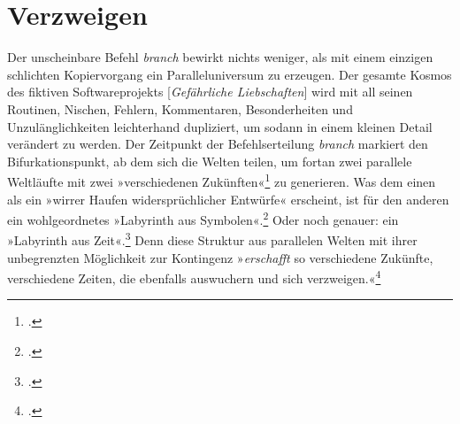 \documentclass[a4paper,11pt]{article}
\newcommand{\anf}[1]{»#1«}
\begin{document}
\section{Verzweigen}

Der unscheinbare Befehl \emph{branch} bewirkt nichts weniger, als mit einem einzigen schlichten Kopiervorgang ein Paralleluniversum zu erzeugen. Der gesamte Kosmos des fiktiven Softwareprojekts [\emph{Gefährliche Liebschaften}] wird mit all seinen Routinen, Nischen, Fehlern, Kommentaren, Besonderheiten und Unzulänglichkeiten leichterhand dupliziert, um sodann in einem kleinen Detail verändert zu werden. Der Zeitpunkt der Befehlserteilung \emph{branch} markiert den Bifurkationspunkt, ab dem sich die Welten teilen, um fortan zwei parallele Weltläufte mit zwei \anf{verschiedenen Zukünften}\footcite[169]{borges:1941} zu generieren. Was dem einen als ein \anf{wirrer Haufen widersprüchlicher Entwürfe} erscheint, ist für den anderen ein wohlgeordnetes \anf{Labyrinth aus Symbolen}.\footcite[168]{borges:1941} Oder noch genauer: ein \anf{Labyrinth aus Zeit}.\footcite[168]{borges:1941} Denn diese Struktur aus parallelen Welten mit ihrer unbegrenzten Möglichkeit zur Kontingenz \anf{\emph{erschafft} so verschiedene Zukünfte, verschiedene Zeiten, die ebenfalls auswuchern und sich verzweigen.}\footcite[170]{borges:1941} 
\end{document}
